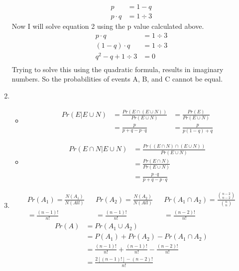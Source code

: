\documentclass{article}
\begin{document}
\begin{enumerate}
			\begin{align}
				p &= 1 - q \\
				p \cdot q &=1 \div 3
			\end{align}
			 Now I will solve equation 2 using the p value calculated above.
			\begin{align*}
				p \cdot q &= 1 \div 3 \\
				(1 - q) \cdot q &= 1 \div 3 \\
				q^2 - q + 1 \div 3 &= 0 \\
			\end{align*}
			Trying to solve this using the quadratic formula, results in imaginary numbers. So the probabilities of events A, B, and C cannot be equal.
		\item %
			\begin{itemize}
			\item
			\begin{align*}
				Pr(E | E \cup N) &= \frac{Pr(E \cap (E \cup N))}{Pr(E \cup N)}
				&= \frac{Pr(E)}{Pr(E \cup N)} \\
				&= \frac{p}{p + q - p \cdot q}
				&= \frac{p}{p(1 - q) + q}
			\end{align*}
			\item
			\begin{align*}
				Pr(E \cap N | E \cup N) &= \frac{Pr((E \cap N) \cap (E \cup N))}{Pr(E \cup N)} \\
				&= \frac{Pr(E \cap N)}{Pr(E \cup N)} \\
				&= \frac{p \cdot q}{p + q - p \cdot q}
			\end{align*}
			\end{itemize}
		\item %
			\begin{align*}
				Pr(A_1) = \frac{N(A_1)}{N(All)} && Pr(A_2) = \frac{N(A_2)}{N(All)} && Pr(A_1 \cap A_2) = \frac{\binom{n - 2}{n - 2}}{\binom{n}{n}} \\
				= \frac{(n - 1)!}{n!} && = \frac{(n - 1)!}{n!} && = \frac{(n - 2)!}{n!}
			\end{align*}
			\begin{align*}
				Pr(A) &= Pr(A_1 \cup A_2) \\
				&= P(A_1) + Pr(A_2) - Pr(A_1 \cap A_2) \\
				&= \frac{(n - 1)!}{n!} + \frac{(n - 1)!}{n!} - \frac{(n - 2)!}{n!}\\
				&= \frac{2[(n - 1)!] - (n - 2)!}{n!}
			\end{align*}
			

\end{enumerate}
\end{document}
